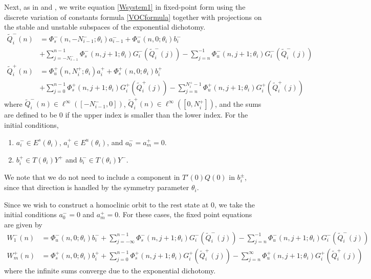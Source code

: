 \documentclass[12pt]{article}
\begin{document}
Next, as in \cite{Sandstede1997} and \cite{Knobloch2000}, we write equation \eqref{Wsystem1} in fixed-point form using the discrete variation of constants formula \eqref{VOCformula} together with projections on the stable and unstable subspaces of the exponential dichotomy.
\begin{equation}\label{FPeqs1}
\begin{aligned}
\tilde{Q}_i^-(n) &= 
\Phi_s^-(n, -N_{i-1}^-; \theta_i) a_{i-1}^- + \Phi_u^-(n, 0; \theta_i) b_i^-  \\
&+ \sum_{j = -N_{i-1}^-}^{n-1} \Phi_s^-(n, j+1; \theta_i) G_i^-(\tilde{Q}_i^-(j)) - \sum_{j = n}^{-1} \Phi_u^-(n, j+1; \theta_i) G_i^-(\tilde{Q}_i^-(j)) \\
\tilde{Q}_i^+(n) &= \Phi_u^+(n, N_i^+; \theta_i) a_i^+ + \Phi_s^+(n, 0; \theta_i) b_i^+ \\
&+ \sum_{j = 0}^{n-1} \Phi_s^+(n, j+1; \theta_i) G_i^+(\tilde{Q}_i^+(j)) 
- \sum_{j = n}^{N_i^+-1} \Phi_u^+(n, j+1; \theta_i) G_i^+(\tilde{Q}_i^+(j))
\end{aligned}
\end{equation}
where $\tilde{Q}_i^-(n) \in \ell^\infty([-N_{i-1}^-, 0])$, $\tilde{Q}_i^+(n) \in \ell^\infty([0, N_i^+])$, and the sums are defined to be $0$ if the upper index is smaller than the lower index. For the initial conditions, 
\begin{enumerate}
\item $a_i^- \in E^s(\theta_i)$, $a_i^+ \in E^u(\theta_i)$, and $a_0^- = a_m^+ = 0$.
\item $b_i^+ \in T(\theta_i) Y^+$ and $b_i^- \in T(\theta_i) Y^-$.
\end{enumerate}
We note that we do not need to include a component in $T'(0) Q(0)$ in $b_i^\pm$, since that direction is handled by the symmetry parameter $\theta_i$.

Since we wish to construct a homoclinic orbit to the rest state at 0, we take the initial conditions $a_0^- = 0$ and $a_m^+ = 0$. For these cases, the fixed point equations are given by
\begin{align*}
W_1^-(n) &= \Phi_u^-(n, 0; \theta_i) b_i^- 
+ \sum_{j = -\infty}^{n-1} \Phi_s^-(n, j+1; \theta_i) G_i^-(\tilde{Q}_i^-(j)) - \sum_{j = n}^{-1} \Phi_u^-(n, j+1; \theta_i) G_i^-(\tilde{Q}_i^-(j)) \\
W_m^+(n) &= \Phi_s^+(n, 0; \theta_i) b_i^+ 
+ \sum_{j = 0}^{n-1} \Phi_s^+(n, j+1; \theta_i) G_i^+(\tilde{Q}_i^+(j)) 
- \sum_{j = n}^\infty \Phi_u^+(n, j+1; \theta_i) G_i^+(\tilde{Q}_i^+(j))
\end{align*}
where the infinite sums converge due to the exponential dichotomy. 
\end{document}
